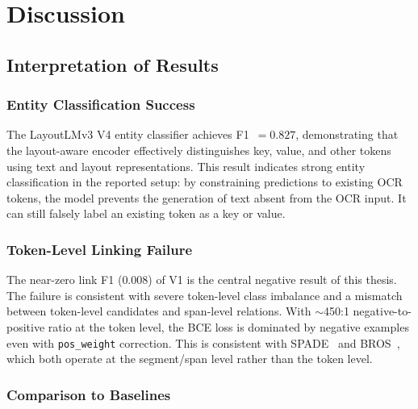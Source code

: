 \chapter{Discussion}
\label{ch:discussion}

\section{Interpretation of Results}
\label{sec:interpretation}

\subsection{Entity Classification Success}

The LayoutLMv3 V4 entity classifier achieves F1~$= 0.827$, demonstrating that
the layout-aware encoder effectively distinguishes key, value, and other tokens
using text and layout representations. This result indicates strong entity
classification in the reported setup: by
constraining predictions to existing OCR tokens, the model prevents the
generation of text absent from the OCR input. It can still falsely label an
existing token as a key or value.

\subsection{Token-Level Linking Failure}

The near-zero link F1 ($0.008$) of V1 is the central negative result of this
thesis. The failure is consistent with severe token-level class imbalance and a
mismatch between token-level candidates and span-level relations.
With $\sim$450:1 negative-to-positive ratio at the token level, the BCE loss
is dominated by negative examples even with \texttt{pos\_weight} correction.
This is consistent with SPADE~\cite{spade} and BROS~\cite{bros}, which both
operate at the segment/span level rather than the token level.

\subsection{Comparison to Baselines}

